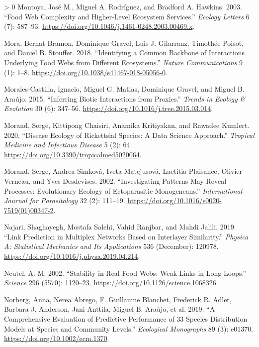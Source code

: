 \documentclass[10pt,oneside]{article}
\newlength{\cslhangindent}
\newenvironment{CSLReferences}[3] %
 {%
  \setlength{\parindent}{0pt}
  \ifodd #1 \everypar{\setlength{\hangindent}{\cslhangindent}}\ignorespaces\fi
  \ifnum #2 > 0
  \setlength{\parskip}{#2\baselineskip}
  \fi
 }%
 {}
\begin{document}
\begin{CSLReferences}{1}{0}
\leavevmode\hypertarget{ref-Montoya2003FooWeb}{}%
Montoya, José M., Miguel A. Rodríguez, and Bradford A. Hawkins. 2003.
{``Food Web Complexity and Higher-Level Ecosystem Services.''}
\emph{Ecology Letters} 6 (7): 587--93.
\url{https://doi.org/10.1046/j.1461-0248.2003.00469.x}.

\leavevmode\hypertarget{ref-Mora2018IdeCom}{}%
Mora, Bernat Bramon, Dominique Gravel, Luis J. Gilarranz, Timothée
Poisot, and Daniel B. Stouffer. 2018. {``Identifying a Common Backbone
of Interactions Underlying Food Webs from Different Ecosystems.''}
\emph{Nature Communications} 9 (1): 1--8.
\url{https://doi.org/10.1038/s41467-018-05056-0}.

\leavevmode\hypertarget{ref-Morales-Castilla2015InfBio}{}%
Morales-Castilla, Ignacio, Miguel G. Matias, Dominique Gravel, and
Miguel B. Araújo. 2015. {``Inferring Biotic Interactions from
Proxies.''} \emph{Trends in Ecology \& Evolution} 30 (6): 347--56.
\url{https://doi.org/10.1016/j.tree.2015.03.014}.

\leavevmode\hypertarget{ref-Morand2020DisEco}{}%
Morand, Serge, Kittipong Chaisiri, Anamika Kritiyakan, and Rawadee
Kumlert. 2020. {``Disease Ecology of Rickettsial Species: A Data Science
Approach.''} \emph{Tropical Medicine and Infectious Disease} 5 (2): 64.
\url{https://doi.org/10.3390/tropicalmed5020064}.

\leavevmode\hypertarget{ref-Morand2002InvPat}{}%
Morand, Serge, Andrea Simková, Iveta Matejusová, Laetitia Plaisance,
Olivier Verneau, and Yves Desdevises. 2002. {``Investigating Patterns
May Reveal Processes: Evolutionary Ecology of Ectoparasitic
Monogeneans.''} \emph{International Journal for Parasitology} 32 (2):
111--19. \url{https://doi.org/10.1016/s0020-7519(01)00347-2}.

\leavevmode\hypertarget{ref-Najari2019LinPre}{}%
Najari, Shaghayegh, Mostafa Salehi, Vahid Ranjbar, and Mahdi Jalili.
2019. {``Link Prediction in Multiplex Networks Based on Interlayer
Similarity.''} \emph{Physica A: Statistical Mechanics and Its
Applications} 536 (December): 120978.
\url{https://doi.org/10.1016/j.physa.2019.04.214}.

\leavevmode\hypertarget{ref-Neutel2002StaRea}{}%
Neutel, A.-M. 2002. {``Stability in Real Food Webs: Weak Links in Long
Loops.''} \emph{Science} 296 (5570): 1120--23.
\url{https://doi.org/10.1126/science.1068326}.

\leavevmode\hypertarget{ref-Norberg2019ComEva}{}%
Norberg, Anna, Nerea Abrego, F. Guillaume Blanchet, Frederick R. Adler,
Barbara J. Anderson, Jani Anttila, Miguel B. Araújo, et al. 2019. {``A
Comprehensive Evaluation of Predictive Performance of 33 Species
Distribution Models at Species and Community Levels.''} \emph{Ecological
Monographs} 89 (3): e01370. \url{https://doi.org/10.1002/ecm.1370}.


\end{CSLReferences}
\end{document}
